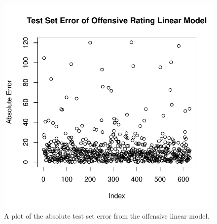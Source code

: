 \documentclass[12pt]{article}
\begin{document}
\begin{figure}[tbp]
	\centering
	\includegraphics[width=\textwidth]{olm.test.error}
	\caption{A plot of the absolute test set error from the offensive linear model.}
	\label{fig:olm.test.error}
\end{figure}

\begin{table}[tbp]
\caption{Offensive Linear Model Evaluators}
\centering
{}
\label{tab:olm-results}
\end{table}
\end{document}
